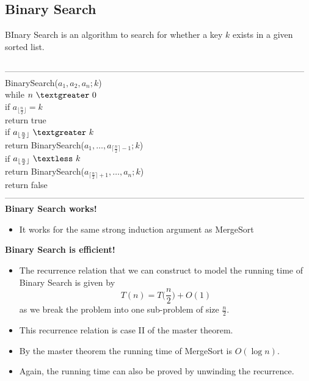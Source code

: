 \documentclass{article}
\newcommand{\tb}[1]{\textbf{#1}}
\newcommand{\lt}{\textless}
\newcommand{\gt}{\textgreater}
\newcommand{\ds}{\displaystyle}
\newcommand{\floor}[1]{\lfloor #1 \rfloor}
\newcommand{\ceil}[1]{\lceil #1 \rceil}
\begin{document}
\subsection{Binary Search}
BInary Search is an algorithm to search for whether a key $k$ exists in a given sorted list.\\\\
---------------------------------------------------------------------------------------------------------
BinarySearch($a_1, a_2, a_n ; k$)\\
	\hspace*{7mm} while $n\ \gt\ 0$\\
	\hspace*{14mm} if $\ds a_{\floor{\frac{n}{2}}} = k$\\
	\hspace*{21mm} return true\\
	\hspace*{14mm} if $\ds a_{\floor{\frac{n}{2}}}\ \gt\ k$\\
	\hspace*{21mm} return BinarySearch($a_1, \dots, a_{\ceil{\frac{n}{2}}-1} ; k$)\\
	\hspace*{14mm} if $\ds a_{\floor{\frac{n}{2}}}\ \lt\ k$\\
	\hspace*{21mm} return BinarySearch($a_{\ceil{\frac{n}{2}}+1}, \dots, a_n ; k$)\\
	\hspace*{7mm} return false\\
---------------------------------------------------------------------------------------------------------\\
\tb{Binary Search works!}
\begin{itemize}
	\item It works for the same strong induction argument as MergeSort
\end{itemize}
\tb{Binary Search is efficient!}
\begin{itemize}
	\item The recurrence relation that we can construct to model the running time of Binary Search is given by
	\[T(n) = T\Big(\frac{n}{2}\Big) + O(1)\]
	as we break the problem into one sub-problem of size $\ds \frac{n}{2}$.
	\item This recurrence relation is case II of the master theorem.
	\item By the master theorem the running time of MergeSort is $O(\log n)$.
	\item Again, the running time can also be proved by unwinding the recurrence.
\end{itemize}
\end{document}
